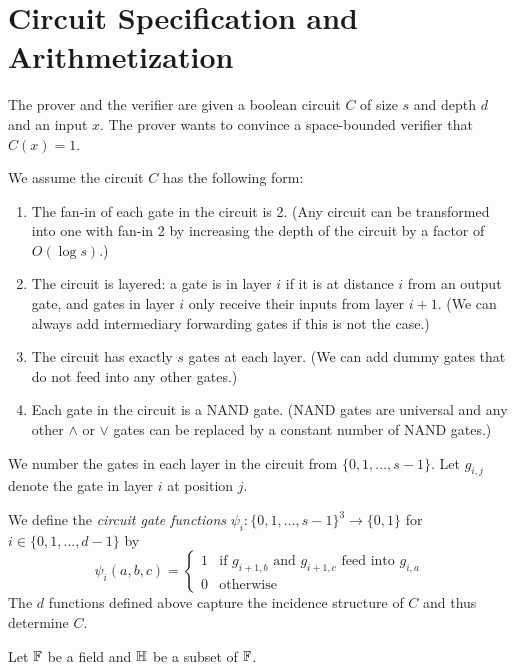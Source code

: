 \section{Circuit Specification and Arithmetization}

The prover and the verifier are given a boolean circuit $C$ of size $s$ and
depth $d$ and an input $x$. The prover wants to convince a space-bounded
verifier that $C(x) = 1$.

We assume the circuit $C$ has the following form:
\begin{enumerate}
  \item The fan-in of each gate in the circuit is 2. (Any circuit can be
    transformed into one with fan-in 2 by increasing the depth of the circuit
    by a factor of $O(\log s)$.)
  \item The circuit is layered: a gate is in layer $i$ if it is at distance $i$
    from an output gate, and gates in layer $i$ only receive their inputs from
    layer $i + 1$. (We can always add intermediary forwarding gates if this is
    not the case.)
  \item The circuit has exactly $s$ gates at each layer. (We can add dummy
    gates that do not feed into any other gates.)
  \item Each gate in the circuit is a NAND gate. (NAND gates are universal and
    any other $\wedge$ or $\vee$ gates can be replaced by a constant number of
    NAND gates.)
\end{enumerate}

We number the gates in each layer in the circuit from $\{0,1,\ldots, s-1\}$.
Let $g_{i,j}$ denote the gate in layer $i$ at position $j$.

\begin{definition}\label{def:psis}
  We define the \emph{circuit gate functions} $\psi_i:\{0,1,\ldots, s-1\}^3 \to
  \{0,1\}$ for $i \in \{0, 1, \ldots, d-1\}$ by
	\[
    \psi_i(a,b,c) = \begin{cases}
      1 &\text{if $g_{i+1,b}$ and $g_{i+1,c}$ feed into $g_{i,a}$}\\
      0 &\text{otherwise}
    \end{cases}
	\]
  The $d$ functions defined above capture the incidence structure of $C$ and
  thus determine $C$.
\end{definition}

Let $\mathbb{F}$ be a field and $\mathbb{H}$ be a subset of $\mathbb{F}$.


